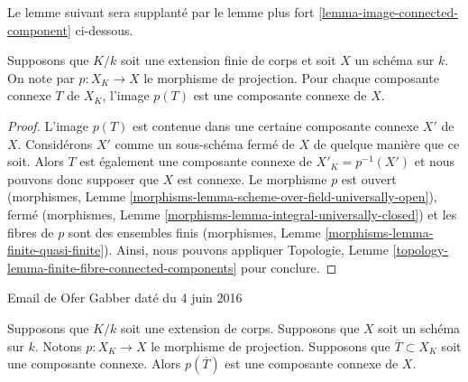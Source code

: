 \noindent
Le lemme suivant sera supplanté par le lemme plus
fort \ref{lemma-image-connected-component} ci-dessous.

\begin{lemma}
\label{lemma-image-connected-component-finite-extension}
Supposons que $K/k$ soit une extension finie de corps et
soit $X$ un schéma sur $k$. On note par $p : X_K \to X$ le
morphisme de projection. Pour chaque composante connexe $T$
de $X_K$, l'image $p(T)$ est une composante connexe de $X$.
\end{lemma}

\begin{proof}
L'image $p(T)$ est contenue dans une certaine composante
connexe $X'$ de $X$. Considérons $X'$ comme un
sous-schéma fermé de $X$ de quelque manière que ce soit.
Alors $T$ est également une composante connexe de $X'_K =
p^{-1}(X')$ et nous pouvons donc supposer que $X$ est
connexe. Le morphisme $p$ est ouvert (morphismes, Lemme
\ref{morphisms-lemma-scheme-over-field-universally-open}),
fermé (morphismes, Lemme
\ref{morphisms-lemma-integral-universally-closed}) et les fibres de
$p$ sont des ensembles finis (morphismes, Lemme
\ref{morphisms-lemma-finite-quasi-finite}). Ainsi, nous pouvons appliquer
Topologie, Lemme \ref{topology-lemma-finite-fibre-connected-components} pour conclure.
\end{proof}

\begin{lemma}[Gabber]
\label{lemma-image-connected-component}
\begin{reference}
Email de Ofer Gabber daté du 4 juin 2016
\end{reference}
Supposons que $K/k$ soit une extension de corps. Supposons que $X$
soit un schéma sur $k$. Notons $p : X_K \to X$ le morphisme de
projection. Supposons que $\overline{T} \subset X_K$ soit une
composante connexe. Alors $p(\overline{T})$ est une composante connexe de $X$.
\end{lemma}

